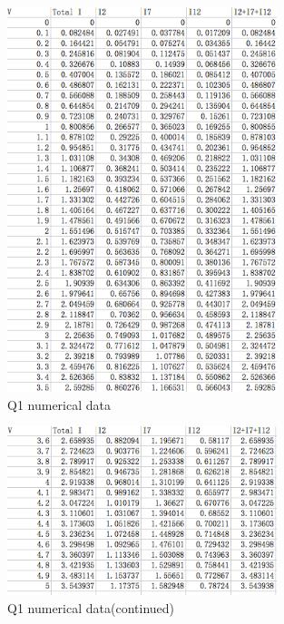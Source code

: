 \documentclass[12pt,a4paper]{article}
\begin{document}
\begin{figure}[h!]
  \centering
     \includegraphics[width=0.7\textwidth]{./q11numerical.png}
  \caption{Q1 numerical data}
\end{figure}
\begin{figure}[h!]
  \centering
     \includegraphics[width=0.7\textwidth]{./q12numerical.png}
  \caption{Q1 numerical data(continued)}
\end{figure}
\end{document}
